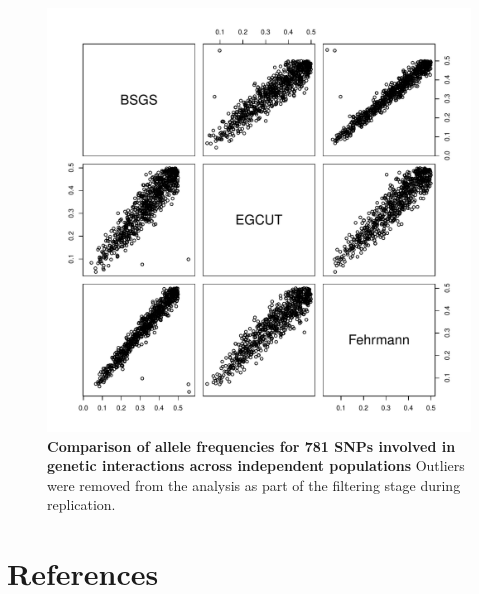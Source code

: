 \documentclass{article}
\begin{document}
\begin{figure}
	\centering
	\includegraphics[width=5in]{alleleFreq}
	\caption{\textbf{Comparison of allele frequencies for 781 SNPs involved in genetic interactions across independent populations} Outliers were removed from the analysis as part of the filtering stage during replication.}
	\label{fig:allelefreq}
\end{figure}




\clearpage
\section{References}

\end{document}

